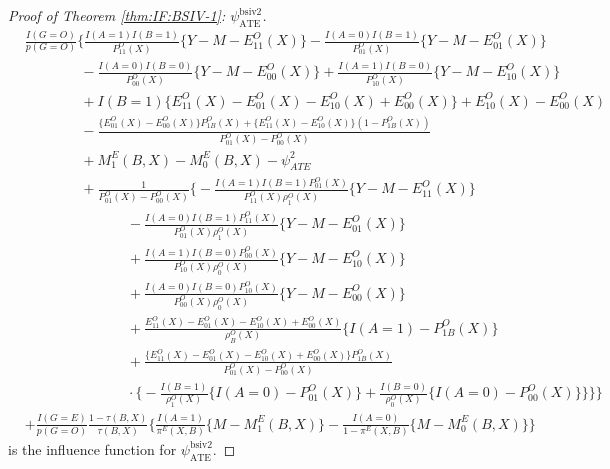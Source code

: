 \documentclass[10pt]{article}
\begin{document}
\begin{proof}[Proof of Theorem \ref{thm:IF:BSIV-1}: $\psi_{\text{ATE}}^{\text{bsiv2}}$]
\begin{align*}
&\frac{I(G=O)}{p(G=O)}\Bigg\{\frac{I(A=1)I(B=1)}{P_{11}^O(X)}\{Y-M-E_{11}^O(X)\}-\frac{I(A=0)I(B=1)}{P_{01}^O(X)}\{Y-M-E_{01}^O(X)\}\\
    &\ \ \ \ \ \ \ \ \ \ \ \ \ \ \ \ \ \ -\frac{I(A=0)I(B=0)}{P_{00}^O(X)}\{Y-M-E_{00}^O(X)\}+\frac{I(A=1)I(B=0)}{P_{10}^O(X)}\{Y-M-E_{10}^O(X)\}\\
    &\ \ \ \ \ \ \ \ \ \ \ \ \ \ \ \ \ \ +I(B=1)\{E_{11}^O(X)-E_{01}^O(X)-E_{10}^O(X)+E_{00}^O(X)\}+E_{10}^O(X)-E_{00}^O(X)\\
    &\ \ \ \ \ \ \ \ \ \ \ \ \ \ \ \ \ \ -\frac{\{E_{01}^O(X)-E_{00}^O(X)\}P_{1B}^O(X)+\{E_{11}^O(X)-E_{10}^O(X)\}(1-P_{1B}^O(X))}{P_{01}^O(X)-P_{00}^O(X)}\\
    &\ \ \ \ \ \ \ \ \ \ \ \ \ \ \ \ \ \ +M_1^E(B,X)-M_0^E(B,X)-\psi_{ATE}^2\\
    &\ \ \ \ \ \ \ \ \ \ \ \ \ \ \ \ \ \ +\frac{1}{P_{01}^O(X)-P_{00}^O(X)}\bigg\{-\frac{I(A=1)I(B=1)P_{01}^O(X)}{P_{11}^O(X)\rho_1^O(X)}\{Y-M-E_{11}^O(X)\}\\
    &\ \ \ \ \ \ \ \ \ \ \ \ \ \ \ \ \ \ \ \ \ \ \ \ \ \ \ \ \ \ \ \ \ -\frac{I(A=0)I(B=1)P_{11}^O(X)}{P_{01}^O(X)\rho_1^O(X)}\{Y-M-E_{01}^O(X)\}\\
    &\ \ \ \ \ \ \ \ \ \ \ \ \ \ \ \ \ \ \ \ \ \ \ \ \ \ \ \ \ \ \ \ \ +\frac{I(A=1)I(B=0)P_{00}^O(X)}{P_{10}^O(X)\rho_0^O(X)}\{Y-M-E_{10}^O(X)\}\\
    &\ \ \ \ \ \ \ \ \ \ \ \ \ \ \ \ \ \ \ \ \ \ \ \ \ \ \ \ \ \ \ \ \ +\frac{I(A=0)I(B=0)P_{10}^O(X)}{P_{00}^O(X)\rho_0^O(X)}\{Y-M-E_{00}^O(X)\}\\
    &\ \ \ \ \ \ \ \ \ \ \ \ \ \ \ \ \ \ \ \ \ \ \ \ \ \ \ \ \ \ \ \ \ +\frac{E_{11}^O(X)-E_{01}^O(X)-E_{10}^O(X)+E_{00}^O(X)}{\rho_B^O(X)}\big\{I(A=1)-P_{1B}^O(X)\big\}\\
    &\ \ \ \ \ \ \ \ \ \ \ \ \ \ \ \ \ \ \ \ \ \ \ \ \ \ \ \ \ \ \ \ \ +\frac{\{E_{11}^O(X)-E_{01}^O(X)-E_{10}^O(X)+E_{00}^O(X)\}P_{1B}^O(X)}{P_{01}^O(X)-P_{00}^O(X)}\\
    &\ \ \ \ \ \ \ \ \ \ \ \ \ \ \ \ \ \ \ \ \ \ \ \ \ \ \ \ \ \ \ \ \ \cdot\big\{-\frac{I(B=1)}{\rho_1^O(X)}\{I(A=0)-P_{01}^O(X)\}+\frac{I(B=0)}{\rho_0^O(X)}\{I(A=0)-P_{00}^O(X)\}\big\}\bigg\}\Bigg\}\\
    &+\frac{I(G=E)}{p(G=O)}\frac{1-\tau(B,X)}{\tau(B,X)}\bigg\{\frac{I(A=1)}{\pi^E(X,B)}\{M-M_1^E(B,X)\}-\frac{I(A=0)}{1-\pi^E(X,B)}\{M-M_0^E(B,X)\}\bigg\}
\end{align*}
is the influence function for $\psi_{\text{ATE}}^{\text{bsiv2}}$.

\end{proof}
\end{document}
